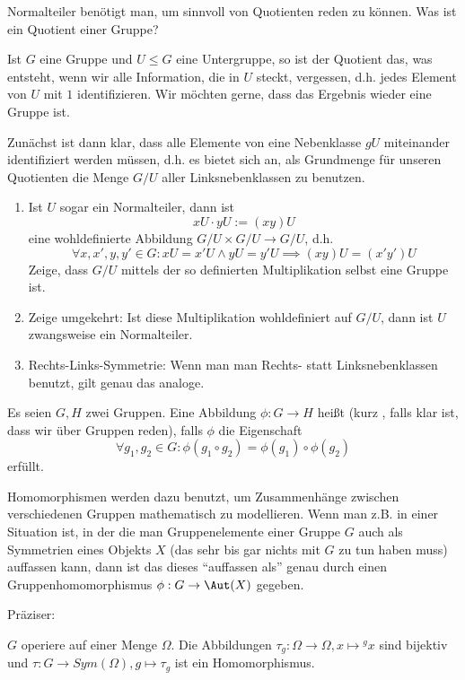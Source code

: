 \begin{sheet}
\begin{problem}[title={Quotientengruppen}, difficulty={fortgeschritten}]
Normalteiler benötigt man, um sinnvoll von Quotienten reden zu können. Was ist ein Quotient einer Gruppe?

Ist $G$ eine Gruppe und $U\leq G$ eine Untergruppe, so ist der Quotient das, was entsteht, wenn wir alle Information, die in $U$ steckt, vergessen, d.h. jedes Element von $U$ mit $1$ identifizieren. Wir möchten gerne, dass das Ergebnis wieder eine Gruppe ist.

Zunächst ist dann klar, dass alle Elemente von eine Nebenklasse $gU$ miteinander identifiziert werden müssen, d.h. es bietet sich an, als Grundmenge für unseren Quotienten die Menge $G/U$ aller Linksnebenklassen zu benutzen.
\begin{enumerate}
\item Ist $U$ sogar ein Normalteiler, dann ist
\[xU \cdot yU := (xy)U\]
eine wohldefinierte Abbildung $G/U \times G/U \to G/U$, d.h.
\[\forall x,x',y,y'\in G: xU=x'U \wedge yU=y'U \implies (xy)U = (x'y')U\]
Zeige, dass $G/U$ mittels der so definierten Multiplikation selbst eine Gruppe ist.
\item Zeige umgekehrt: Ist diese Multiplikation wohldefiniert auf $G/U$, dann ist $U$ zwangsweise ein Normalteiler.
\item Rechts-Links-Symmetrie: Wenn man man Rechts- statt Linksnebenklassen benutzt, gilt genau das analoge.
\end{enumerate}
\end{problem}



\begin{problem}[title={Gruppenhomomorphismen}]
Es seien $G,H$ zwei Gruppen. Eine Abbildung $\phi: G\to H$ heißt  (kurz , falls klar ist, dass wir über Gruppen reden), falls $\phi$ die Eigenschaft
\[\forall g_1,g_2\in G: \phi(g_1\circ g_2) = \phi(g_1)\circ \phi(g_2)\]
erfüllt.

Homomorphismen werden dazu benutzt, um Zusammenhänge zwischen verschiedenen Gruppen mathematisch zu modellieren. Wenn man z.B. in einer Situation ist, in der die man Gruppenelemente einer Gruppe $G$ auch als Symmetrien eines Objekts $X$ (das sehr bis gar nichts mit $G$ zu tun haben muss) auffassen kann, dann ist das dieses \enquote{auffassen als} genau durch einen Gruppenhomomorphismus $\phi: G\to\Aut(X)$ gegeben.

Präziser:
\begin{subproblem}
$G$ operiere auf einer Menge $\Omega$. Die Abbildungen $\tau_g: \Omega\to\Omega, x\mapsto{^g x}$ sind bijektiv und $\tau: G\to Sym(\Omega), g\mapsto\tau_g$ ist ein Homomorphismus.


\end{subproblem}
\end{problem}
\end{sheet}

